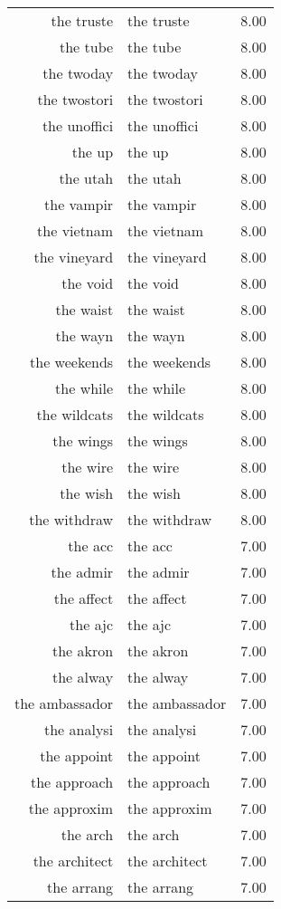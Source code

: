 \begin{table}[ht]
\begin{tabular}{rlr}
  the truste & the truste & 8.00 \\ 
  the tube & the tube & 8.00 \\ 
  the twoday & the twoday & 8.00 \\ 
  the twostori & the twostori & 8.00 \\ 
  the unoffici & the unoffici & 8.00 \\ 
  the up & the up & 8.00 \\ 
  the utah & the utah & 8.00 \\ 
  the vampir & the vampir & 8.00 \\ 
  the vietnam & the vietnam & 8.00 \\ 
  the vineyard & the vineyard & 8.00 \\ 
  the void & the void & 8.00 \\ 
  the waist & the waist & 8.00 \\ 
  the wayn & the wayn & 8.00 \\ 
  the weekends & the weekends & 8.00 \\ 
  the while & the while & 8.00 \\ 
  the wildcats & the wildcats & 8.00 \\ 
  the wings & the wings & 8.00 \\ 
  the wire & the wire & 8.00 \\ 
  the wish & the wish & 8.00 \\ 
  the withdraw & the withdraw & 8.00 \\ 
  the acc & the acc & 7.00 \\ 
  the admir & the admir & 7.00 \\ 
  the affect & the affect & 7.00 \\ 
  the ajc & the ajc & 7.00 \\ 
  the akron & the akron & 7.00 \\ 
  the alway & the alway & 7.00 \\ 
  the ambassador & the ambassador & 7.00 \\ 
  the analysi & the analysi & 7.00 \\ 
  the appoint & the appoint & 7.00 \\ 
  the approach & the approach & 7.00 \\ 
  the approxim & the approxim & 7.00 \\ 
  the arch & the arch & 7.00 \\ 
  the architect & the architect & 7.00 \\ 
  the arrang & the arrang & 7.00 \\ 

\end{tabular}
\end{table}
